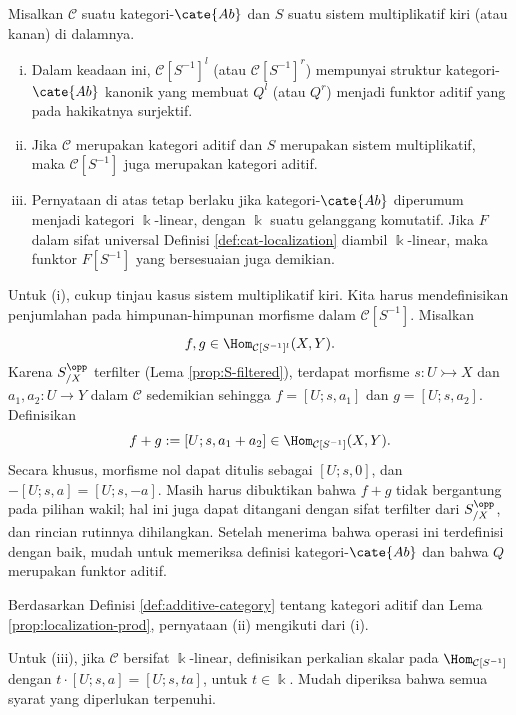 \begin{teorema}\label{prop:localization-additivity}
	Misalkan $\mathcal{C}$ suatu kategori-$\cate{Ab}$ dan $S$ suatu sistem
	multiplikatif kiri (atau kanan) di dalamnya.
	\begin{enumerate}[(i)]
		\item Dalam keadaan ini, $\mathcal{C}[S^{-1}]^l$ (atau
		$\mathcal{C}[S^{-1}]^r$) mempunyai struktur kategori-$\cate{Ab}$
		kanonik yang membuat $Q^l$ (atau $Q^r$) menjadi funktor aditif yang
		pada hakikatnya surjektif.
		\item Jika $\mathcal{C}$ merupakan kategori aditif dan $S$ merupakan
		sistem multiplikatif, maka $\mathcal{C}[S^{-1}]$ juga merupakan
		kategori aditif.
		\item Pernyataan di atas tetap berlaku jika kategori-$\cate{Ab}$
		diperumum menjadi kategori $\Bbbk$-linear, dengan $\Bbbk$ suatu
		gelanggang komutatif. Jika $F$ dalam sifat universal Definisi
		\ref{def:cat-localization} diambil $\Bbbk$-linear, maka funktor
		$F[S^{-1}]$ yang bersesuaian juga demikian.
	\end{enumerate}
\end{teorema}
\begin{bukti}
	Untuk (i), cukup tinjau kasus sistem multiplikatif kiri. Kita harus
	mendefinisikan penjumlahan pada himpunan-himpunan morfisme dalam
	$\mathcal{C}[S^{-1}]$. Misalkan
	\[
		f,g\in\Hom_{\mathcal{C}[S^{-1}]^l}(X,Y).
	\]
	Karena $S_{/X}^{\opp}$
	terfilter (Lema \ref{prop:S-filtered}), terdapat morfisme
	$s:U\rightarrowtail X$ dan $a_1,a_2:U\to Y$ dalam $\mathcal{C}$
	sedemikian sehingga $f=[U;s,a_1]$ dan $g=[U;s,a_2]$. Definisikan
	\[ f + g := [U; s, a_1 + a_2] \in \Hom_{\mathcal{C}[S^{-1}]}(X, Y). \]
	Secara khusus, morfisme nol dapat ditulis sebagai $[U;s,0]$, dan
	$-[U;s,a]=[U;s,-a]$. Masih harus dibuktikan bahwa $f+g$ tidak bergantung
	pada pilihan wakil; hal ini juga dapat ditangani dengan sifat terfilter
	dari $S_{/X}^{\opp}$, dan rincian rutinnya dihilangkan. Setelah menerima
	bahwa operasi ini terdefinisi dengan baik, mudah untuk memeriksa definisi
	kategori-$\cate{Ab}$ dan bahwa $Q$ merupakan funktor aditif.

	Berdasarkan Definisi \ref{def:additive-category} tentang kategori aditif
	dan Lema \ref{prop:localization-prod}, pernyataan (ii) mengikuti dari (i).

	Untuk (iii), jika $\mathcal{C}$ bersifat $\Bbbk$-linear, definisikan
	perkalian skalar pada $\Hom_{\mathcal{C}[S^{-1}]}$ dengan
	$t\cdot[U;s,a]=[U;s,ta]$, untuk $t\in\Bbbk$. Mudah diperiksa bahwa semua
	syarat yang diperlukan terpenuhi.
\end{bukti}


